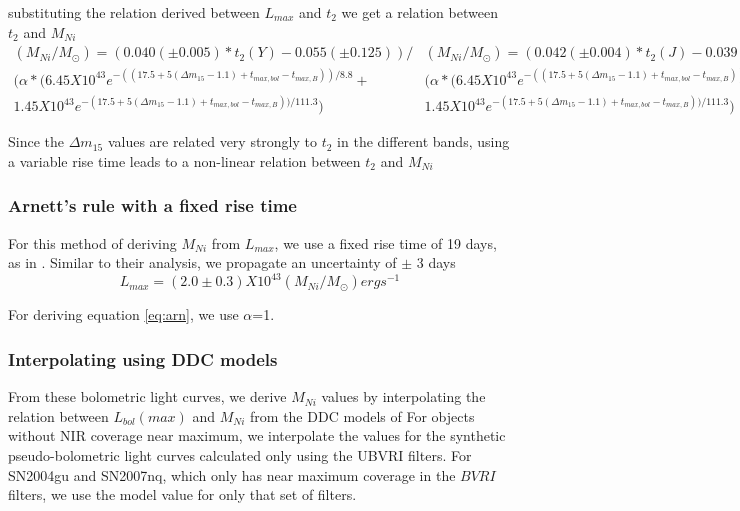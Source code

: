 substituting the relation derived between $L_{max}$ and $t_2$ we get a relation between $t_2$ and $M_{Ni}$
\begin{subequations}
\begin{multline}
(M_{Ni}/M_{\odot})=(0.040(\pm 0.005) * t_2(Y) - 0.055 (\pm 0.125))/\\(\alpha * (6.45  X  10^{43} e^{-((17.5 + 5(\Delta m_{15} - 1.1)
+t_{max, bol} -t_{max, B}))/8.8} + \\ 1.45  X  10^{43} e^{-(17.5 + 5(\Delta m_{15} - 1.1)+t_{max, bol} -t_{max, B}))/111.3})
\end{multline}
\begin{multline}
(M_{Ni}/M_{\odot})=(0.042(\pm 0.004) * t_2(J) - 0.039 (\pm 0.102))/\\(\alpha * (6.45  X  10^{43} e^{-((17.5 + 5(\Delta m_{15} - 1.1)
+t_{max, bol} -t_{max, B}))/8.8} + \\ 1.45  X  10^{43} e^{-(17.5 + 5(\Delta m_{15} - 1.1)+t_{max, bol} -t_{max, B}))/111.3})
\end{multline}
\begin{multline}
(M_{Ni}/M_{\odot})=(0.033(\pm 0.009) * t_2(H) - 0.239 (\pm 0.203))/\\ (\alpha * (6.45  X  10^{43} e^{-((17.5 + 5(\Delta m_{15} - 1.1)
+t_{max, bol} -t_{max, B}))/8.8} + \\ 1.45  X  10^{43} e^{-(17.5 + 5(\Delta m_{15} - 1.1)+t_{max, bol} -t_{max, B}))/111.3})
\end{multline}
\end{subequations}

Since the $\Delta m_{15}$ values are related very strongly to $t_2$ in the different bands, using a variable rise time leads to a non-linear relation between $t_2$ and $M_{Ni}$  
\subsubsection{Arnett's rule with a fixed rise time}
For this method of deriving $M_{Ni}$ from $L_{max}$, we use a fixed rise time of 19 days, as in \citet{stritzinger2006}. Similar to their analysis, we propagate an uncertainty of $\pm$ 3 days 
\begin{equation}
\label{eq:arn}
L_{max}=(2.0 \pm 0.3) X 10^{43} (M_{Ni}/M_{\odot}) erg s^{-1}
\end{equation}

For deriving equation \eqref{eq:arn}, we use $\alpha$=1. 

\subsubsection{Interpolating using DDC models}
From these bolometric light curves, we derive $M_{Ni}$ values by interpolating the relation between  $L_{bol}(max)$ and $M_{Ni}$ from the DDC models of \citet{Blondin2013}
For objects without NIR coverage near maximum, we interpolate the values for the synthetic pseudo-bolometric light curves 
calculated only using the UBVRI filters. For SN2004gu and SN2007nq, which only has near maximum coverage in the $BVRI$ filters, we use the model value for only that set of filters. 

